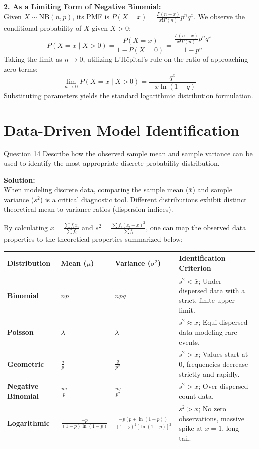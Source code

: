 \documentclass[11pt, a4paper]{article}
\begin{document}
\vspace{0.3cm}
\noindent\textbf{2. As a Limiting Form of Negative Binomial:} \\
Given $X \sim \mathrm{NB}(n, p)$, its PMF is $P(X=x) = \frac{\Gamma(n+x)}{x!\Gamma(n)} p^n q^x$. We observe the conditional probability of $X$ given $X > 0$:
\[ P(X = x \mid X > 0) = \frac{P(X=x)}{1 - P(X=0)} = \frac{\frac{\Gamma(n+x)}{x!\Gamma(n)} p^n q^x}{1 - p^n} \]
Taking the limit as $n \to 0$, utilizing L'Hôpital's rule on the ratio of approaching zero terms:
\[ \lim_{n \to 0} P(X = x \mid X > 0) = \frac{q^x}{-x \ln(1-q)} \]
Substituting parameters yields the standard logarithmic distribution formulation.

\clearpage
\section{Data-Driven Model Identification}

\begin{problem}{Question 14}
Describe how the observed sample mean and sample variance can be used to identify the most appropriate discrete probability distribution.
\end{problem}

\noindent\textbf{Solution:} \\
When modeling discrete data, comparing the sample mean ($\bar{x}$) and sample variance ($s^2$) is a critical diagnostic tool. Different distributions exhibit distinct theoretical mean-to-variance ratios (dispersion indices). 

By calculating $\bar{x} = \frac{\sum f_i x_i}{\sum f_i}$ and $s^2 = \frac{\sum f_i (x_i - \bar{x})^2}{\sum f_i}$, one can map the observed data properties to the theoretical properties summarized below:

\begin{table}[h!]
\centering
\renewcommand{\arraystretch}{1.6}
\begin{tabular}{p{3cm} p{2.5cm} p{3cm} p{5.5cm}}
\toprule
\textbf{Distribution} & \textbf{Mean ($\mu$)} & \textbf{Variance ($\sigma^2$)} & \textbf{Identification Criterion} \\
\midrule
\textbf{Binomial} & $np$ & $npq$ & $s^2 < \bar{x}$; Under-dispersed data with a strict, finite upper limit. \\
\textbf{Poisson} & $\lambda$ & $\lambda$ & $s^2 \approx \bar{x}$; Equi-dispersed data modeling rare events. \\
\textbf{Geometric} & $\frac{q}{p}$ & $\frac{q}{p^2}$ & $s^2 > \bar{x}$; Values start at $0$, frequencies decrease strictly and rapidly. \\
\textbf{Negative Binomial} & $\frac{nq}{p}$ & $\frac{nq}{p^2}$ & $s^2 > \bar{x}$; Over-dispersed count data. \\
\textbf{Logarithmic} & $\frac{-p}{(1-p)\ln(1-p)}$ & $\frac{-p(p+\ln(1-p))}{(1-p)^2[\ln(1-p)]^2}$ & $s^2 > \bar{x}$; No zero observations, massive spike at $x=1$, long tail. \\
\bottomrule
\end{tabular}
\end{table}
\end{document}
